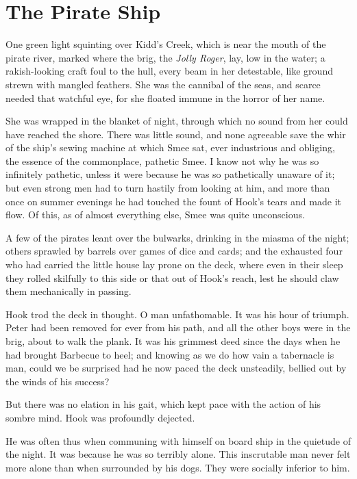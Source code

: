 
\chapter{The Pirate Ship}

One green light squinting over Kidd’s Creek, which is near the mouth of the pirate river,
marked where the brig, the \emph{Jolly Roger}, lay,
low in the water;
a rakish-looking craft foul to the hull,
every beam in her detestable, like ground strewn with mangled feathers.
She was the cannibal of the seas,
and scarce needed that watchful eye, for she floated immune in the horror of her name.

She was wrapped in the blanket of night,
through which no sound from her could have reached the shore.
There was little sound,
and none agreeable save the whir of the ship’s sewing machine at which Smee sat, ever industrious and obliging,
the essence of the commonplace, pathetic Smee.
I know not why he was so infinitely pathetic,
unless it were because he was so pathetically unaware of it;
but even strong men had to turn hastily from looking at him,
and more than once on summer evenings he had touched the fount of Hook’s tears and made it flow.
Of this, as of almost everything else, Smee was quite unconscious.

A few of the pirates leant over the bulwarks, drinking in the miasma of the night;
others sprawled by barrels over games of dice and cards;
and the exhausted four who had carried the little house lay prone on the deck,
where even in their sleep they rolled skilfully to this side or that out of Hook’s reach,
lest he should claw them mechanically in passing.

Hook trod the deck in thought.
O man unfathomable.
It was his hour of triumph.
Peter had been removed for ever from his path, and all the other boys were in the brig,
about to walk the plank.
It was his grimmest deed since the days when he had brought Barbecue to heel;
and knowing as we do how vain a tabernacle is man,
could we be surprised had he now paced the deck unsteadily,
bellied out by the winds of his success?

But there was no elation in his gait, which kept pace with the action of his sombre mind.
Hook was profoundly dejected.

He was often thus when communing with himself on board ship in the quietude of the night.
It was because he was so terribly alone.
This inscrutable man never felt more alone than when surrounded by his dogs.
They were socially inferior to him.

